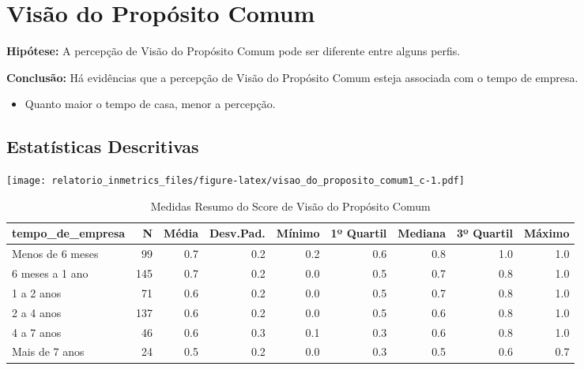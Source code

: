 \documentclass[]{book}
\providecommand{\tightlist}{%
  \setlength{\itemsep}{0pt}\setlength{\parskip}{0pt}}
\begin{document}
\pagebreak

\hypertarget{visao-do-proposito-comum-1}{%
\section{Visão do Propósito Comum}\label{visao-do-proposito-comum-1}}

\textbf{Hipótese:} A percepção de Visão do Propósito Comum pode ser diferente entre alguns perfis.

\textbf{Conclusão:} Há evidências que a percepção de Visão do Propósito Comum esteja associada com o tempo de empresa.

\begin{itemize}
\tightlist
\item
  Quanto maior o tempo de casa, menor a percepção.
\end{itemize}

\hypertarget{estatisticas-descritivas-9}{%
\subsection{Estatísticas Descritivas}\label{estatisticas-descritivas-9}}

\texttt{[image: relatorio\_inmetrics\_files/figure-latex/visao\_do\_proposito\_comum1\_c-1.pdf]}

\begin{table}[t]

\caption{\label{tab:unnamed-chunk-27}Medidas Resumo do Score de Visão do Propósito Comum}
\centering
\fontsize{7}{9}\selectfont
\begin{tabular}{lrrrrrrrr}
\toprule
tempo\_de\_empresa & N & Média & Desv.Pad. & Mínimo & 1º Quartil & Mediana & 3º Quartil & Máximo\\
\midrule
Menos de 6 meses & 99 & 0.7 & 0.2 & 0.2 & 0.6 & 0.8 & 1.0 & 1.0\\
6 meses a 1 ano & 145 & 0.7 & 0.2 & 0.0 & 0.5 & 0.7 & 0.8 & 1.0\\
1 a 2 anos & 71 & 0.6 & 0.2 & 0.0 & 0.5 & 0.7 & 0.8 & 1.0\\
2 a 4 anos & 137 & 0.6 & 0.2 & 0.0 & 0.5 & 0.6 & 0.8 & 1.0\\
4 a 7 anos & 46 & 0.6 & 0.3 & 0.1 & 0.3 & 0.6 & 0.8 & 1.0\\
\addlinespace
Mais de 7 anos & 24 & 0.5 & 0.2 & 0.0 & 0.3 & 0.5 & 0.6 & 0.7\\
\bottomrule
\end{tabular}
\end{table}
\end{document}

